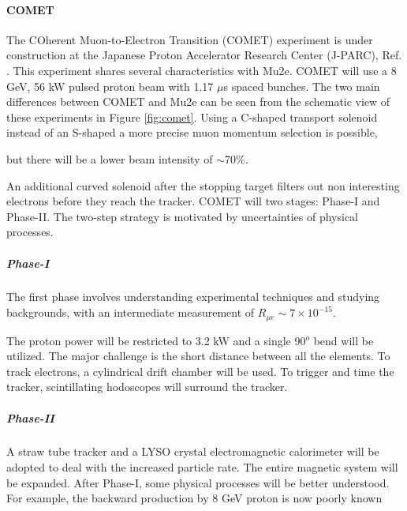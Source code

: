 \paragraph{COMET}
The COherent Muon-to-Electron Transition (COMET) experiment is under construction at
the Japanese Proton Accelerator Research Center (J-PARC), Ref. \cite{Abramishvili_2020}. 
This experiment shares several characteristics with Mu2e. COMET will use a 8 GeV, 56 kW pulsed proton beam
with 1.17 $\mu$s spaced bunches. The two main differences between
COMET and Mu2e can be seen from the schematic view of these experiments 
in Figure \ref{fig:comet}.
{\red Using a C-shaped transport solenoid instead of an S-shaped a more precise muon momentum selection 
  is possible}, 

{\red but there will be a lower beam intensity of $\sim$70\%.}

An additional curved solenoid after the stopping target filters out non 
interesting electrons before they reach the tracker.
COMET will  two stages: Phase-I and Phase-II.
{\red The two-step strategy is motivated by uncertainties of physical processes. }

\subparagraph*{Phase-I} The first phase involves understanding experimental techniques and studying backgrounds, 
{\red with an intermediate measurement of $R_{\mu e} \sim 7\times 10^{-15}$.}

The proton power will be restricted to 
3.2 kW and a single 90$^o$ bend will be utilized.
The major challenge is the short distance between all the elements. 
To track electrons, a cylindrical drift chamber will be used. To trigger and time the tracker, 
scintillating hodoscopes will surround the tracker. 
\subparagraph*{Phase-II} A straw tube tracker and a LYSO crystal electromagnetic 
calorimeter will be adopted to deal with the increased particle rate. 
The entire magnetic system will be  expanded.
After Phase-I, some physical processes will be better understood.
For example, {\red the backward production by 8 GeV proton is now poorly known}

